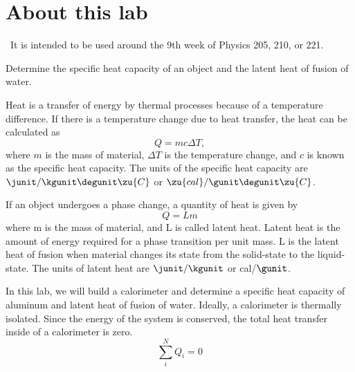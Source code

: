\addtocounter{chapter}{-1}
\renewcommand\thechapter{c1.9b}
\label{lab:calorimetry}

\section*{About this lab}

\covid\ 
It is intended to be used around the 9th week of Physics 205, 210, or 221.

\apparatus
{}

\begin{goals}

\item[] Determine the specific heat capacity of an object and the latent heat of fusion of water.

\end{goals}

\introduction
Heat is a transfer of energy by thermal processes because of a temperature difference. If there is a temperature change due to heat transfer, the heat can be calculated as
\begin{equation*}
Q = m c \Delta T,
\end{equation*}
where $m$ is the mass of material, $\Delta T$ is the temperature
change, and $c$ is known as the specific heat capacity. The units of the specific
heat capacity are 
$\junit /\kgunit \degunit\zu{C}$ or $\zu{cal}/\gunit \degunit\zu{C}$.

If an object undergoes a phase change, a quantity of heat is given by
\begin{equation*}
Q = L m
\end{equation*}
where m is the mass of material, and L is called latent heat.  Latent heat is the amount of energy required for a phase transition per unit mass. L is the latent heat of fusion when material changes its state from the solid-state to the liquid-state. The units of latent heat are $\junit /\kgunit$ or cal/$\gunit $.


In this lab, we will build a calorimeter and determine a specific heat capacity of aluminum and latent heat of fusion of water. Ideally, a calorimeter is thermally isolated. Since the energy of the system is conserved, the total heat transfer inside of a calorimeter is zero.  
\begin{equation*}
\sum_i^N Q_i = 0
\end{equation*}



